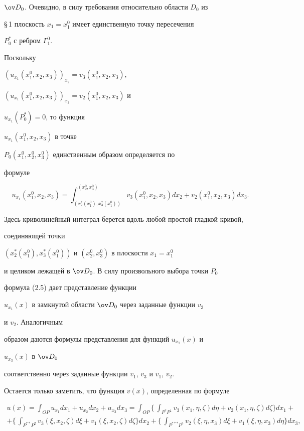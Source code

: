 $\ov D_0$. Очевидно, в силу требования относительно области $D_0$ из


\S\,1 плоскость $x_1=x^0_1$ имеет единственную точку пересечения


$P^*_0$ с ребром $\Gamma^0_1$.





Поскольку


$(u_{x_1}(x^0_1,x_2,x_3))_{x_2}=v_3(x^0_1,x_2,x_3)$,


$(u_{x_1}(x^0_1,x_2,x_3))_{x_3}=v_2(x^0_1,x_2,x_3)$ и


$u_{x_1}(P^*_0)=0$, то функция


$u_{x_1}(x^0_1,x_2,x_3)$ в точке


$P_0(x^0_1,x^0_2,x^0_3)$ единственным образом определяется по


формуле


\begin{equation}


u_{x_1}(x^0_1,x_2,x_3)=


\int^{(x^0_2,x^0_3)}_{(x^*_2(x^0_1),x^*_3(x^0_1))}


v_3(x^0_1,x_2,x_3)dx_2+v_2(x^0_1,x_2,x_3)dx_3.


\end{equation}


Здесь криволинейный интеграл берется вдоль любой простой гладкой кривой,


соединяющей точки


$(x^*_2(x^0_1),x^*_3(x^0_1))$ и $(x^0_2,x^0_3)$ в плоскости $x_1=x^0_1$


и целиком лежащей в $\ov D_0$. В силу произвольного выбора точки $P_0$


формула (2.5) дает представление функции


$u_{x_1}(x)$ в замкнутой области $\ov D_0$ через заданные функции $v_3$


и $v_2$. Аналогичным


образом даются формулы представления для функций $u_{x_2}(x)$ и


$u_{x_3}(x)$ в $\ov D_0$


соответственно через заданные функции $v_1$, $v_3$ и $v_1$, $v_2$.


Остается только заметить, что функция $v(x)$, определенная по формуле


\begin{multline}


u(x)=\int_{OP}u_{x_1}dx_1+u_{x_2}dx_2+u_{x_3}dx_3=


\int_{OP}\biggl\{\,\int_{P^*P^1}v_3(x_1,\eta,\zeta)d\eta+


v_2(x_1,\eta,\zeta)d\zeta\biggr\}dx_1+ \\


%


+\biggl\{\,\int_{P^{**}P^2}v_3(\xi,x_2,\zeta)d\xi+


v_1(\xi,x_2,\zeta)d\zeta\biggr\}dx_2+


\biggl\{\,\int_{P^{*{*}*}P^3}v_2(\xi,\eta,x_3)d\xi+


v_1(\xi,\eta,x_3)d\eta\biggr\}dx_3,


\end{multline}


